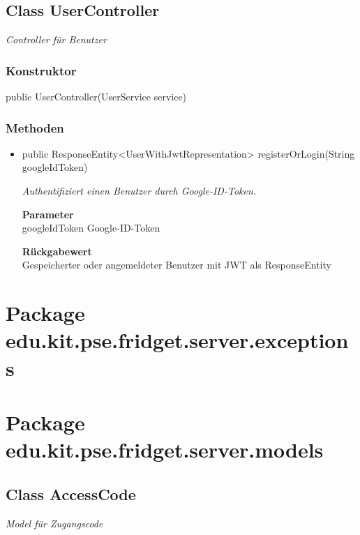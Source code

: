 \documentclass[a4paper]{scrreprt}
\begin{document}
        \subsection{Class UserController}
        \textit{Controller für Benutzer}
        \subsubsection{Konstruktor}
        public UserController(UserService service)
        \subsubsection{Methoden}
        \begin{itemize}
        	\item{public ResponseEntity<UserWithJwtRepresentation> registerOrLogin(String googleIdToken)}
        	
        	\textit{Authentifiziert einen Benutzer durch Google-ID-Token.}
        	
        	\textbf{Parameter} \\
        	googleIdToken Google-ID-Token
        	
        	\textbf{Rückgabewert} \\
        	Gespeicherter oder angemeldeter Benutzer mit JWT als ResponseEntity
        \end{itemize}
        \section{Package edu.kit.pse.fridget.server.exceptions}
        \section{Package edu.kit.pse.fridget.server.models}
        \subsection{Class AccessCode}
        \textit{Model für Zugangscode}
\end{document}
